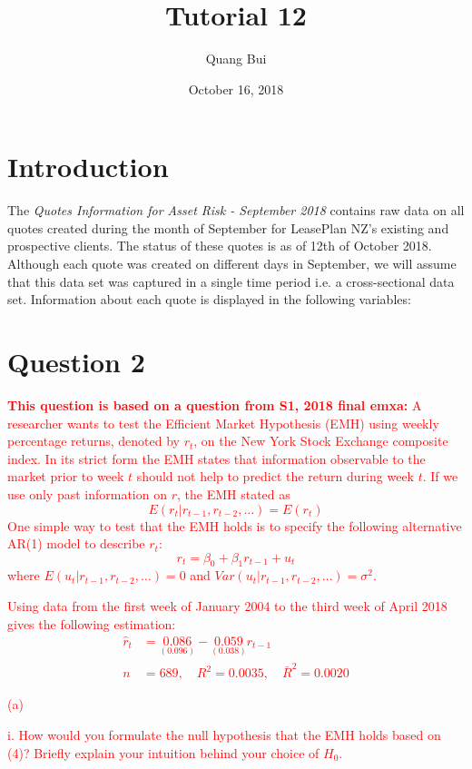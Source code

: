 \documentclass[12pt]{report}
\title{Tutorial 12}
\subtitle
{
\textbf{keywords}: exam revision

\textbf{estimated reading time}: 36 minutes
}
\author{Quang Bui}
\date{October 16, 2018}
\begin{document}
\maketitle

\section*{Introduction}
\noindent The \textit{Quotes Information for Asset Risk - September 2018} contains raw data on all quotes created during the month of September for LeasePlan NZ's existing and prospective clients. The status of these quotes is as of 12th of October 2018. Although each quote was created on different days in September, we will assume that this data set was captured in a single time period i.e. a cross-sectional data set. Information about each quote is displayed in the following variables:

\newpage
\section*{Question 2}

\noindent \textcolor{red}{\textbf{This question is based on a question from S1, 2018 final emxa:} A researcher wants to test the Efficient Market Hypothesis (EMH) using weekly percentage returns, denoted by $r_t$, on the New York Stock Exchange composite index. In its strict form the EMH states that information observable to the market prior to week $t$ should not help to predict the return during week $t$. If we use only past information on $r$, the EMH stated as $$E(r_t|r_{t-1}, r_{t-2}, \dots) = E(r_t)$$ One simple way to test that the EMH holds is to specify the following alternative AR(1) model to describe $r_t$: $$r_t = \beta_0 + \beta_1 r_{t-1} + u_t$$ where $E(u_t|r_{t-1}, r_{t-2}, \dots) = 0$ and $Var(u_t|r_{t-1}, r_{t-2}, \dots) = \sigma^2$.}

\noindent \textcolor{red}{Using data from the first week of January 2004 to the third week of April 2018 gives the following estimation: \begin{align*}
		\hat{r}_t &= \underset{(0.096)}{0.086} - \underset{(0.038)}{0.059}r_{t-1} \\
		n &= 689, \quad R^2 = 0.0035, \quad \bar{R}^2 = 0.0020
	\end{align*}}

\noindent \textcolor{red}{(a)}

\noindent \textcolor{red}{i. How would you formulate the null hypothesis that the EMH holds based on (4)? Briefly explain your intuition behind your choice of $H_0$.}
\end{document}
